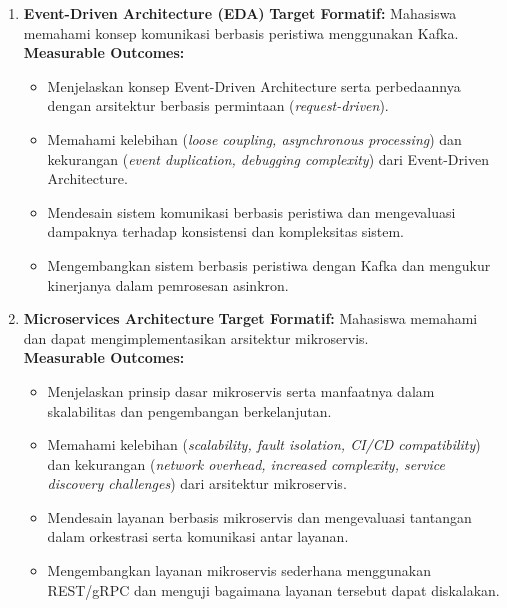 \begin{enumerate}
\item \textbf{Event-Driven Architecture (EDA)}  
\textbf{Target Formatif:} Mahasiswa memahami konsep komunikasi berbasis peristiwa menggunakan Kafka.  \\
\textbf{Measurable Outcomes:}
\begin{itemize}
	\item Menjelaskan konsep Event-Driven Architecture serta perbedaannya dengan arsitektur berbasis permintaan (\textit{request-driven}).
	\item Memahami kelebihan (\textit{loose coupling, asynchronous processing}) dan kekurangan (\textit{event duplication, debugging complexity}) dari Event-Driven Architecture.
	\item Mendesain sistem komunikasi berbasis peristiwa dan mengevaluasi dampaknya terhadap konsistensi dan kompleksitas sistem.
	\item Mengembangkan sistem berbasis peristiwa dengan Kafka dan mengukur kinerjanya dalam pemrosesan asinkron.
\end{itemize}

\item \textbf{Microservices Architecture}  
\textbf{Target Formatif:} Mahasiswa memahami dan dapat mengimplementasikan arsitektur mikroservis.  \\
\textbf{Measurable Outcomes:}
\begin{itemize}
\item Menjelaskan prinsip dasar mikroservis serta manfaatnya dalam skalabilitas dan pengembangan berkelanjutan.
\item Memahami kelebihan (\textit{scalability, fault isolation, CI/CD compatibility}) dan kekurangan (\textit{network overhead, increased complexity, service discovery challenges}) dari arsitektur mikroservis.
\item Mendesain layanan berbasis mikroservis dan mengevaluasi tantangan dalam orkestrasi serta komunikasi antar layanan.
\item Mengembangkan layanan mikroservis sederhana menggunakan REST/gRPC dan menguji bagaimana layanan tersebut dapat diskalakan.
\end{itemize}


\end{enumerate}
